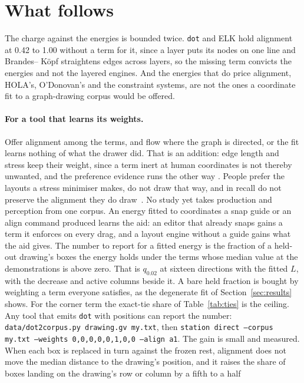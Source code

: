 \documentclass[11pt]{article}
\begin{document}
\section{What follows}\label{sec:discussion}

The charge against the energies is bounded twice. \texttt{dot} and ELK hold alignment at
0.42 to 1.00 without a term for it, since a layer puts its nodes on one line and Brandes--
K\"opf straightens edges across layers, so the missing term convicts the energies and not
the layered engines. And the energies that do price alignment, HOLA's, O'Donovan's and the constraint systems, are not the ones a coordinate
fit to a graph-drawing corpus would be offered.

\paragraph{For a tool that learns its weights.} Offer alignment among the terms, and flow
where the graph is directed, or the fit learns nothing of what the drawer did. That is an
addition: edge length and stress keep their weight, since a term inert at human
coordinates is not thereby unwanted, and the preference evidence runs the other way
\cite{mooney25, dwyer09}. People prefer the layouts a stress minimiser makes, do not draw
that way, and in recall do not preserve the alignment they do draw~\cite{marriott12}. No
study yet takes production and perception from one corpus. An energy fitted to
coordinates a snap guide or an align command produced learns the aid: an editor that
already snaps gains a term it enforces on every drag, and a layout engine without a guide
gains what the aid gives. The number to report for a fitted energy is the fraction of a held-out drawing's
boxes the energy holds under the terms whose median value at the demonstrations is above
zero. That is $q_{0.02}$ at sixteen directions with the fitted $L$, with the decrease and
active columns beside it. A bare held fraction is bought by weighting a term everyone satisfies,
as the degenerate fit of Section~\ref{sec:results} shows. For the corner term the
exact-tie share of Table~\ref{tab:ties} is the ceiling. Any tool that emits
\texttt{dot} with positions can report the number:
\texttt{data/dot2corpus.py drawing.gv my.txt}, then \texttt{station direct --corpus
my.txt --weights 0,0,0,0,0,1,0,0 --align a1}. The gain is small and measured. When each box is replaced in turn against the frozen rest,
alignment does not move the median distance to the drawing's position, and it raises the
share of boxes landing on the drawing's row or column by a fifth to a half
\end{document}
